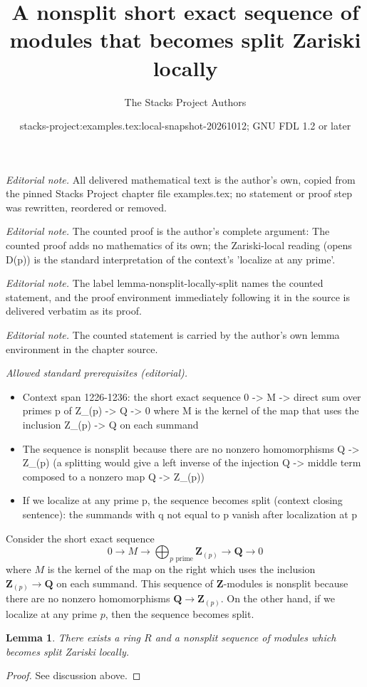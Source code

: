 \documentclass[10pt,a4paper]{amsart}
\title{A nonsplit short exact sequence of modules that becomes split Zariski locally}
\author{The Stacks Project Authors}
\date{stacks-project:examples.tex:local-snapshot-20261012; GNU FDL 1.2 or later}
\theoremstyle{plain}
\newtheorem{lemma}[subsection]{Lemma}
\theoremstyle{definition}
\theoremstyle{remark}
\numberwithin{equation}{subsection}
\begin{document}
\maketitle
\noindent\textit{Editorial note.} All delivered mathematical text is the author's own, copied from the pinned Stacks Project chapter file examples.tex; no statement or proof step was rewritten, reordered or removed.\par\medskip
\noindent\textit{Editorial note.} The counted proof is the author's complete argument: The counted proof adds no mathematics of its own; the Zariski-local reading (opens D(p)) is the standard interpretation of the context's 'localize at any prime'.\par\medskip
\noindent\textit{Editorial note.} The label lemma-nonsplit-locally-split names the counted statement, and the proof environment immediately following it in the source is delivered verbatim as its proof.\par\medskip
\noindent\textit{Editorial note.} The counted statement is carried by the author's own lemma environment in the chapter source.\par\medskip
\noindent\textit{Allowed standard prerequisites (editorial).}\begin{itemize}
\item Context span 1226-1236: the short exact sequence 0 -> M -> direct sum over primes p of Z\_(p) -> Q -> 0 where M is the kernel of the map that uses the inclusion Z\_(p) -> Q on each summand
\item The sequence is nonsplit because there are no nonzero homomorphisms Q -> Z\_(p) (a splitting would give a left inverse of the injection Q -> middle term composed to a nonzero map Q -> Z\_(p))
\item If we localize at any prime p, the sequence becomes split (context closing sentence): the summands with q not equal to p vanish after localization at p
\end{itemize}\medskip
\noindent
Consider the short exact sequence
$$
0 \to M \to
\bigoplus\nolimits_{p\text{ prime}} \mathbf{Z}_{(p)} \to \mathbf{Q} \to 0
$$
where $M$ is the kernel of the map on the right which uses the inclusion
$\mathbf{Z}_{(p)} \to \mathbf{Q}$ on each summand. This sequence of
$\mathbf{Z}$-modules is nonsplit because there are no nonzero
homomorphisms $\mathbf{Q} \to \mathbf{Z}_{(p)}$. On the other hand, if
we localize at any prime $p$, then the sequence becomes split.

\begin{lemma}
\label{lemma-nonsplit-locally-split}
There exists a ring $R$ and a nonsplit sequence of modules
which becomes split Zariski locally.
\end{lemma}

\begin{proof}
See discussion above.
\end{proof}
\end{document}
